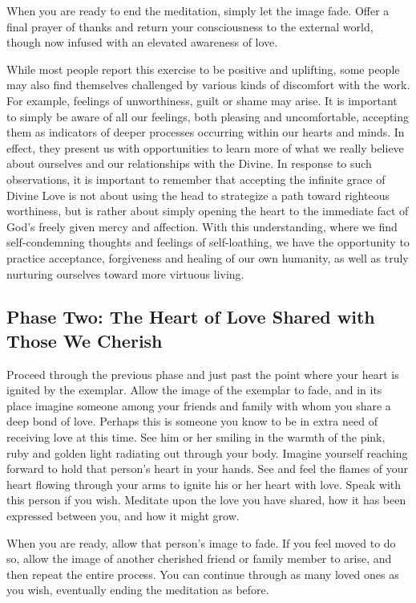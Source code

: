 When you are ready to end the meditation, simply let the image fade. Offer a final prayer
of thanks and return your consciousness to the external world, though now infused with
an elevated awareness of love.

While most people report this exercise to be positive and uplifting, some people may also
find themselves challenged by various kinds of discomfort with the work. For example,
feelings of unworthiness, guilt or shame may arise. It is important to simply be aware of
all our feelings, both pleasing and uncomfortable, accepting them as indicators of deeper
processes occurring within our hearts and minds. In effect, they present us with
opportunities to learn more of what we really believe about ourselves and our
relationships with the Divine. In response to such observations, it is important to
remember that accepting the infinite grace of Divine Love is not about using the head to
strategize a path toward righteous worthiness, but is rather about simply opening the heart
to the immediate fact of God’s freely given mercy and affection. With this
understanding, where we find self-condemning thoughts and feelings of self-loathing, we
have the opportunity to practice acceptance, forgiveness and healing of our own
humanity, as well as truly nurturing ourselves toward more virtuous living. 


\subsection{Phase Two: The Heart of Love Shared with Those We Cherish}

Proceed through the previous phase and just past the point where your heart is ignited by
the exemplar. Allow the image of the exemplar to fade, and in its place imagine someone
among your friends and family with whom you share a deep bond of love. Perhaps this is
someone you know to be in extra need of receiving love at this time. See him or her
smiling in the warmth of the pink, ruby and golden light radiating out through your body.
Imagine yourself reaching forward to hold that person’s heart in your hands. See and feel
the flames of your heart flowing through your arms to ignite his or her heart with love.
Speak with this person if you wish. Meditate upon the love you have shared, how it has
been expressed between you, and how it might grow.

When you are ready, allow that person’s image to fade. If you feel moved to do so, allow
the image of another cherished friend or family member to arise, and then repeat the
entire process. You can continue through as many loved ones as you wish, eventually
ending the meditation as before.

